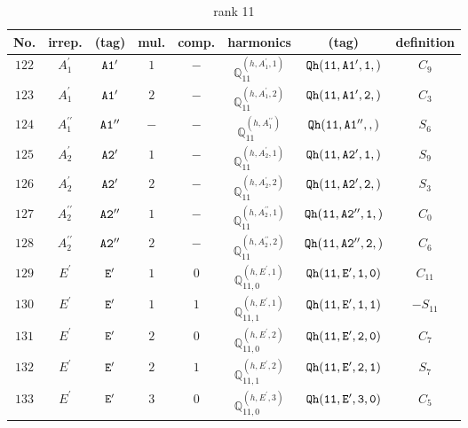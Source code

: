 \documentclass[fleqn,8pt]{jsarticle}
\begin{document}
\begin{table}[ht!]
\begin{center}
\caption{rank 11}
\renewcommand{\arraystretch}{1.3}
\begin{tabular}{cccccccc} \hline \hline
No. & irrep. & (tag) & mul. & comp. & harmonics & (tag) & definition \\ \hline
$ 122 $ & $ A_{1}^{\prime} $ & $ {\tt A1'} $ & $ 1 $ & $ - $ & $ \mathbb{Q}_{11}^{(h,A_{1}^{\prime},1)} $ & $ {\tt Qh(11,A1',1,)} $ & $ C_{9} $ \\
$ 123 $ & $ A_{1}^{\prime} $ & $ {\tt A1'} $ & $ 2 $ & $ - $ & $ \mathbb{Q}_{11}^{(h,A_{1}^{\prime},2)} $ & $ {\tt Qh(11,A1',2,)} $ & $ C_{3} $ \\
$ 124 $ & $ A_{1}^{\prime\prime} $ & $ {\tt A1''} $ & $ - $ & $ - $ & $ \mathbb{Q}_{11}^{(h,A_{1}^{\prime\prime})} $ & $ {\tt Qh(11,A1'',,)} $ & $ S_{6} $ \\
$ 125 $ & $ A_{2}^{\prime} $ & $ {\tt A2'} $ & $ 1 $ & $ - $ & $ \mathbb{Q}_{11}^{(h,A_{2}^{\prime},1)} $ & $ {\tt Qh(11,A2',1,)} $ & $ S_{9} $ \\
$ 126 $ & $ A_{2}^{\prime} $ & $ {\tt A2'} $ & $ 2 $ & $ - $ & $ \mathbb{Q}_{11}^{(h,A_{2}^{\prime},2)} $ & $ {\tt Qh(11,A2',2,)} $ & $ S_{3} $ \\
$ 127 $ & $ A_{2}^{\prime\prime} $ & $ {\tt A2''} $ & $ 1 $ & $ - $ & $ \mathbb{Q}_{11}^{(h,A_{2}^{\prime\prime},1)} $ & $ {\tt Qh(11,A2'',1,)} $ & $ C_{0} $ \\
$ 128 $ & $ A_{2}^{\prime\prime} $ & $ {\tt A2''} $ & $ 2 $ & $ - $ & $ \mathbb{Q}_{11}^{(h,A_{2}^{\prime\prime},2)} $ & $ {\tt Qh(11,A2'',2,)} $ & $ C_{6} $ \\
$ 129 $ & $ E^{\prime} $ & $ {\tt E'} $ & $ 1 $ & $ 0 $ & $ \mathbb{Q}_{11,0}^{(h,E^{\prime},1)} $ & $ {\tt Qh(11,E',1,0)} $ & $ C_{11} $ \\
$ 130 $ & $ E^{\prime} $ & $ {\tt E'} $ & $ 1 $ & $ 1 $ & $ \mathbb{Q}_{11,1}^{(h,E^{\prime},1)} $ & $ {\tt Qh(11,E',1,1)} $ & $ - S_{11} $ \\
$ 131 $ & $ E^{\prime} $ & $ {\tt E'} $ & $ 2 $ & $ 0 $ & $ \mathbb{Q}_{11,0}^{(h,E^{\prime},2)} $ & $ {\tt Qh(11,E',2,0)} $ & $ C_{7} $ \\
$ 132 $ & $ E^{\prime} $ & $ {\tt E'} $ & $ 2 $ & $ 1 $ & $ \mathbb{Q}_{11,1}^{(h,E^{\prime},2)} $ & $ {\tt Qh(11,E',2,1)} $ & $ S_{7} $ \\
$ 133 $ & $ E^{\prime} $ & $ {\tt E'} $ & $ 3 $ & $ 0 $ & $ \mathbb{Q}_{11,0}^{(h,E^{\prime},3)} $ & $ {\tt Qh(11,E',3,0)} $ & $ C_{5} $ \\

\end{tabular}
\end{center}
\end{table}
\end{document}
